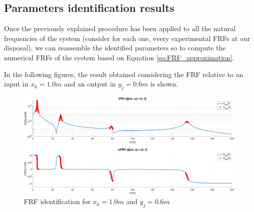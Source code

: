 \subsection{Parameters identification results}
\label{subsec:parameters_identification_results}

Once the previously explained procedure has been applied to all the natural frequencies of the system (consider for each one, every experimental FRFs at our disposal), we can reassemble the identified parameters so to compute the numerical FRFs of the system based on Equation \ref{eq:FRF_approximation}.

In the following figures, the result obtained considering the FRF relative to an input in $x_k = 1.0m$ and an output in $y_j = 0.6m$ is shown.

\begin{figure}[H]
    \centering
    \includegraphics[width=\textwidth]{img/MATLAB/Part_A/Comparison_FRF_couple_3_5.png}
    \caption{FRF identification for $x_k = 1.0m$ and $y_j = 0.6m$}
    \label{fig:FRF_identification}
\end{figure}


